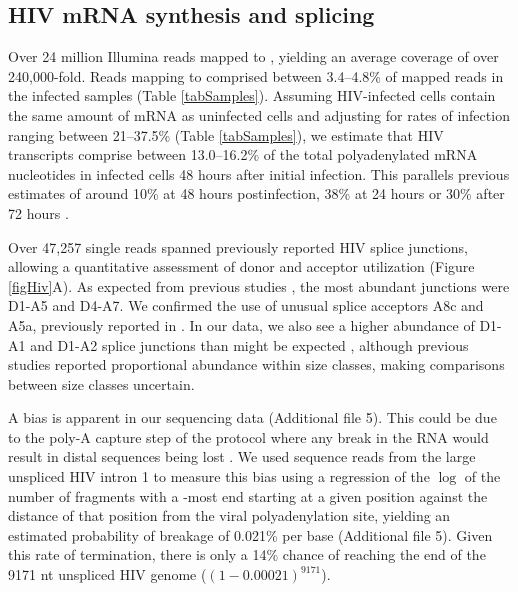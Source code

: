 \documentclass[../sherrill-Mix_thesis.tex]{subfiles}
\begin{document}
	\subsection{HIV mRNA synthesis and splicing} %
		Over 24 million Illumina reads mapped to \hivEight{}, yielding an average coverage of over 240,000-fold.  Reads mapping to \hivEight{} comprised between 3.4--4.8\% of mapped reads in the infected samples (Table \ref{tabSamples}). Assuming HIV-infected cells contain the same amount of mRNA as uninfected cells and adjusting for rates of infection ranging between 21--37.5\% (Table \ref{tabSamples}), we estimate that HIV transcripts comprise between 13.0--16.2\% of the total polyadenylated mRNA nucleotides in infected cells 48 hours after initial infection. This parallels previous estimates of around 10\% \citep{Whisnant2013} at 48 hours postinfection, 38\% at 24 hours \citep{Chang2011} or 30\% after 72 hours \citep{Corbeil2001}. %

		Over 47,257 single reads spanned previously reported HIV splice junctions, allowing a quantitative assessment of donor and acceptor utilization (Figure \ref{figHiv}A). As expected from previous studies \citep{Purcell1993,Ocwieja2012}, the most abundant junctions were D1-A5 and D4-A7.  We confirmed the use of unusual splice acceptors A8c and A5a, previously reported in \hivEight{} \citep{Ocwieja2012}. In our data, we also see a higher abundance of D1-A1 and D1-A2 splice junctions than might be expected \citep{Purcell1993,Ocwieja2012}, although previous studies reported proportional abundance within size classes, making comparisons between size classes uncertain. %

		A \threePrime{} bias is apparent in our sequencing data (Additional file 5). This could be due to the poly-A capture step of the protocol where any break in the RNA would result in distal \fivePrime{} sequences being lost \citep{Lahens2014}. We used sequence reads from the large unspliced HIV intron 1 to measure this bias using a regression of the $\log$ of the number of fragments with a \fivePrime{}-most end starting at a given position against the distance of that position from the viral polyadenylation site, yielding an estimated probability of breakage of 0.021\% per base (Additional file 5). Given this rate of termination, there is only a 14\% chance of reaching the \fivePrime{} end of the 9171 nt unspliced HIV genome (\((1-0.00021)^{9171}\)). 
\end{document}
